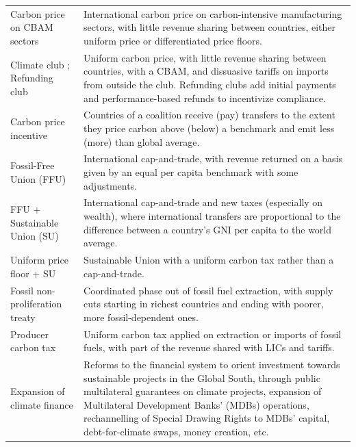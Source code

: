 \documentclass[12pt,english]{article}
\begin{document}
\begin{table}
{\begin{tabular}[t]{P{6.1cm}P{14.3cm}}
  Carbon price on CBAM sectors \citep{wolfram_building_2025} & International carbon price on carbon-intensive manufacturing sectors, with little revenue sharing between countries, either uniform price or differentiated price floors. \\
  Climate club \citep{nordhaus_climate_2015,cramton_international_2015,weitzman_world_2017}; Refunding club \citep{finus_mechanism_2024,gersbach_long-term_2021} & Uniform carbon price, with little revenue sharing between countries, with a CBAM, and dissuasive tariffs on imports from outside the club. Refunding clubs add initial payments and performance-based refunds to incentivize compliance. \\
  Carbon price incentive \citep{stoft_flexible_2009} & Countries of a coalition receive (pay) transfers to the extent they price carbon above (below) a benchmark and emit less (more) than global average. \\
  Fossil-Free Union (FFU) \citep{fabre_global_2025} & International cap-and-trade, with revenue returned on a basis given by an equal per capita benchmark with some adjustments. \\ %
  FFU + Sustainable Union (SU) \citep{fabre_global_2025} &  International cap-and-trade and new taxes (especially on wealth), where international transfers are proportional to the difference between a country's GNI per capita to the world average. \\%
  Uniform price floor + SU  & Sustainable Union with a %
  uniform carbon tax rather than a cap-and-trade. \\
  Fossil non-proliferation treaty \citep{newell_towards_2020,calverley_phaseout_2022} & Coordinated phase out of fossil fuel extraction, with supply cuts starting in richest countries and ending with poorer, more fossil-dependent ones. \\ 
  Producer carbon tax \citep{peszko_cooperative_2019} &  Uniform carbon tax applied on extraction or imports of fossil fuels, with part of the revenue shared with LICs and tariffs. \\
  Expansion of climate finance \citep{songwe_raising_2024,mazzucato_green_2024,bridgetown_initiative_bridgetown_2025,hourcade_climate_2025,green_climate_fund_scaling_2021,dafermos_climate_2025}  & Reforms to the financial system to orient investment towards sustainable projects in the Global South, through public multilateral guarantees on climate projects, expansion of Multilateral Development Banks' (MDBs) operations, rechannelling of Special Drawing Rights to MDBs' capital, debt-for-climate swaps, money creation, etc. \\

\end{tabular}}
\end{table}
\end{document}
